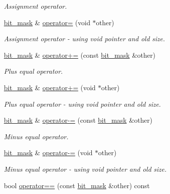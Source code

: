 \begin{DoxyCompactItemize}
\begin{DoxyCompactList}\small\item\em Assignment operator. \end{DoxyCompactList}\item 
\hyperlink{classcrap_1_1bit__mask}{bit\-\_\-mask} \& \hyperlink{classcrap_1_1bit__mask_a8016eccdef681ee9190740e9afcfec08}{operator=} (void $\ast$other)
\begin{DoxyCompactList}\small\item\em Assignment operator -\/ using void pointer and old size. \end{DoxyCompactList}\item 
\hyperlink{classcrap_1_1bit__mask}{bit\-\_\-mask} \& \hyperlink{classcrap_1_1bit__mask_ac9f560b976b5adb616f4c542f4bad7af}{operator+=} (const \hyperlink{classcrap_1_1bit__mask}{bit\-\_\-mask} \&other)
\begin{DoxyCompactList}\small\item\em Plus equal operator. \end{DoxyCompactList}\item 
\hyperlink{classcrap_1_1bit__mask}{bit\-\_\-mask} \& \hyperlink{classcrap_1_1bit__mask_a4b04d247cde37c205ebd1e2d33bcd7c6}{operator+=} (void $\ast$other)
\begin{DoxyCompactList}\small\item\em Plus equal operator -\/ using void pointer and old size. \end{DoxyCompactList}\item 
\hyperlink{classcrap_1_1bit__mask}{bit\-\_\-mask} \& \hyperlink{classcrap_1_1bit__mask_a3b2d989f4ebcbbe605a1b9630aa5f4fe}{operator-\/=} (const \hyperlink{classcrap_1_1bit__mask}{bit\-\_\-mask} \&other)
\begin{DoxyCompactList}\small\item\em Minus equal operator. \end{DoxyCompactList}\item 
\hyperlink{classcrap_1_1bit__mask}{bit\-\_\-mask} \& \hyperlink{classcrap_1_1bit__mask_a74ed54d678c71941a2e070a04d46c0a9}{operator-\/=} (void $\ast$other)
\begin{DoxyCompactList}\small\item\em Minus equal operator -\/ using void pointer and old size. \end{DoxyCompactList}\item 
bool \hyperlink{classcrap_1_1bit__mask_a9dbab8eb36612aceffd9e9d15255f473}{operator==} (const \hyperlink{classcrap_1_1bit__mask}{bit\-\_\-mask} \&other) const 

\end{DoxyCompactItemize}
